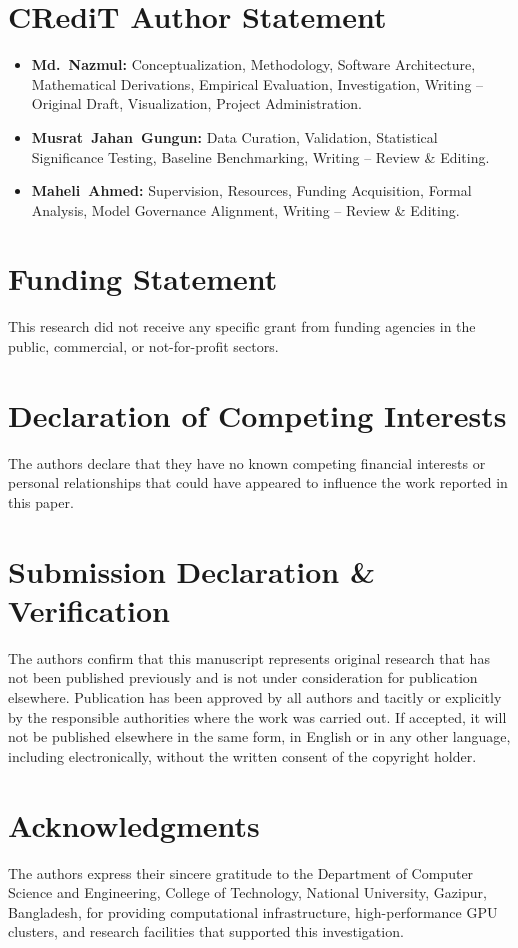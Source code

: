 \documentclass[a4paper,11pt]{article}
\begin{document}
\section*{CRediT Author Statement}
\begin{itemize}[leftmargin=*]
    \item \textbf{Md.~Nazmul:} Conceptualization, Methodology, Software Architecture, Mathematical Derivations, Empirical Evaluation, Investigation, Writing -- Original Draft, Visualization, Project Administration.
    \item \textbf{Musrat~Jahan~Gungun:} Data Curation, Validation, Statistical Significance Testing, Baseline Benchmarking, Writing -- Review \& Editing.
    \item \textbf{Maheli~Ahmed:} Supervision, Resources, Funding Acquisition, Formal Analysis, Model Governance Alignment, Writing -- Review \& Editing.
\end{itemize}

\section*{Funding Statement}
This research did not receive any specific grant from funding agencies in the public, commercial, or not-for-profit sectors.

\section*{Declaration of Competing Interests}
The authors declare that they have no known competing financial interests or personal relationships that could have appeared to influence the work reported in this paper.

\section*{Submission Declaration \& Verification}
The authors confirm that this manuscript represents original research that has not been published previously and is not under consideration for publication elsewhere. Publication has been approved by all authors and tacitly or explicitly by the responsible authorities where the work was carried out. If accepted, it will not be published elsewhere in the same form, in English or in any other language, including electronically, without the written consent of the copyright holder.

\section*{Acknowledgments}
The authors express their sincere gratitude to the Department of Computer Science and Engineering, College of Technology, National University, Gazipur, Bangladesh, for providing computational infrastructure, high-performance GPU clusters, and research facilities that supported this investigation.
\end{document}
